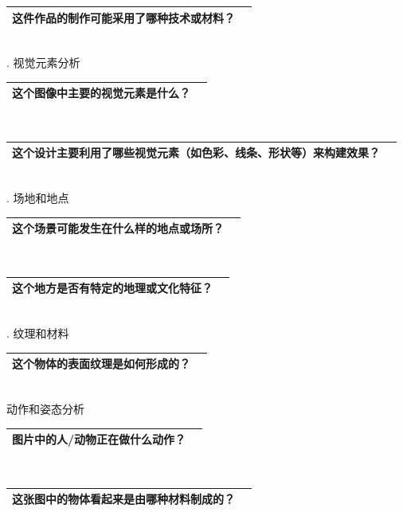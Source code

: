 \documentclass[12pt]{book}
\begin{document}
\begin{tabular}{|p{15cm}|p{3cm}|}
	\hline
这件作品的制作可能采用了哪种技术或材料？\\
	\hline
\end{tabular}\\


. 视觉元素分析

\begin{tabular}{|p{15cm}|p{3cm}|}
	\hline
这个图像中主要的视觉元素是什么？\\
	\hline
\end{tabular}\\


\begin{tabular}{|p{15cm}|p{3cm}|}
	\hline
这个设计主要利用了哪些视觉元素（如色彩、线条、形状等）来构建效果？\\
	\hline
\end{tabular}\\


. 场地和地点

\begin{tabular}{|p{15cm}|p{3cm}|}
	\hline
这个场景可能发生在什么样的地点或场所？\\
	\hline
\end{tabular}\\



\begin{tabular}{|p{15cm}|p{3cm}|}
	\hline
这个地方是否有特定的地理或文化特征？\\
	\hline
\end{tabular}\\


. 纹理和材料

\begin{tabular}{|p{15cm}|p{3cm}|}
	\hline
这个物体的表面纹理是如何形成的？\\
	\hline
\end{tabular}\\

\bigskip
动作和姿态分析

\begin{tabular}{|p{15cm}|p{3cm}|}
	\hline
	图片中的人/动物正在做什么动作？\\
	\hline
\end{tabular}\\


\begin{tabular}{|p{15cm}|p{3cm}|}
	\hline
这张图中的物体看起来是由哪种材料制成的？\\
	\hline
\end{tabular}\\
\end{document}
